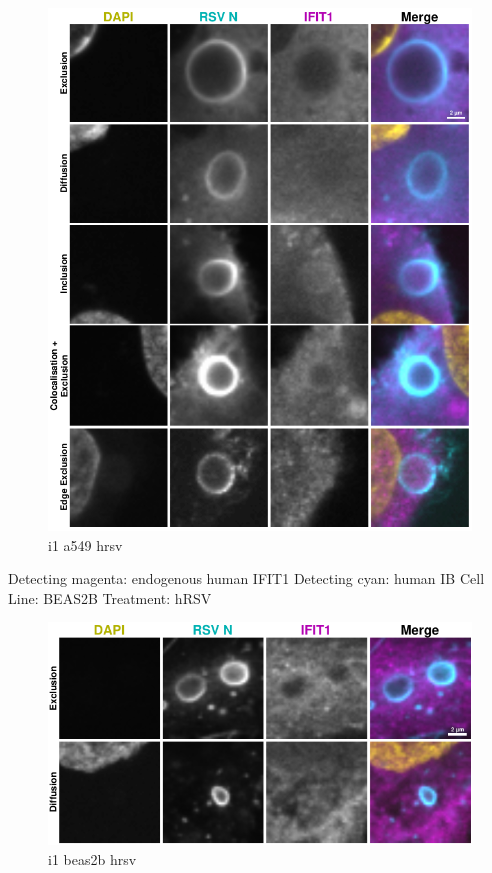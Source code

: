 \begin{figure}
    \centering
    \includegraphics[width=1\linewidth]{09. Chapter 4/Figs/02. Infection/01. a549 i1.pdf}
    \caption[i1 a549 hrsv]{i1 a549 hrsv}
    \label{fig:i1 a549 hrsv}
\end{figure}


Detecting magenta: endogenous human IFIT1 \newline
Detecting cyan: human IB \newline
Cell Line: BEAS2B \newline
Treatment: hRSV \newline

\begin{figure}
    \centering
    \includegraphics[width=1\linewidth]{09. Chapter 4/Figs/02. Infection/02. beas2b i1.pdf}
    \caption[i1 beas2b hrsv]{i1 beas2b hrsv}
    \label{fig:i1 beas2b hrsv}
\end{figure}

